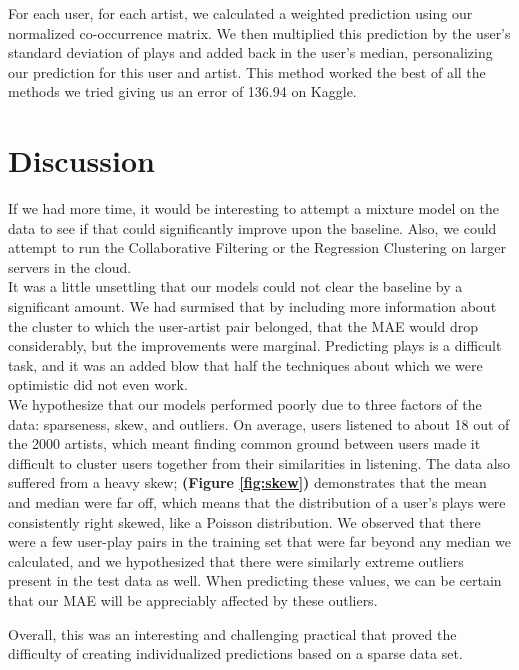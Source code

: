\documentclass[11pt]{article}
\begin{document}
For each user, for each artist, we calculated a weighted prediction using our normalized co-occurrence matrix.  We then multiplied this prediction by the user's standard deviation of plays and added back in the user's median, personalizing our prediction for this user and artist. This method worked the best of all the methods we tried giving us an error of 136.94 on Kaggle. \\

\section{Discussion}


 If we had more time, it would be interesting to attempt a mixture model on the data to see if that could significantly improve upon the baseline.  Also, we could attempt to run the Collaborative Filtering or the Regression Clustering on larger servers in the cloud.\\
 
 It was a little unsettling that our models could not clear the baseline by a significant amount. We had surmised that by including more information about the cluster to which the user-artist pair belonged, that the MAE would drop considerably, but the improvements were marginal. Predicting plays is a difficult task, and it was an added blow that half the techniques about which we were optimistic did not even work. \\ 
 
 We hypothesize that our models performed poorly due to three factors of the data: sparseness, skew, and outliers. On average, users listened to about 18 out of the 2000 artists, which meant finding common ground between users made it difficult to cluster users together from their similarities in listening. The data also suffered from a heavy skew; {\bf (Figure \ref{fig:skew})} demonstrates that the mean and median were far off, which means that the distribution of a user's plays were consistently right skewed, like a Poisson distribution. We observed that there were a few user-play pairs in the training set that were far beyond any median we calculated, and we hypothesized that there were similarly extreme outliers present in the test data as well. When predicting these values, we can be certain that our MAE will be appreciably affected by these outliers. 
 
 Overall, this was an interesting and challenging practical that proved the difficulty of creating individualized predictions based on a sparse data set.
 
\end{document}
